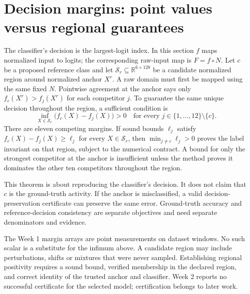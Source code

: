 \documentclass[11pt,a4paper]{article}
\newcommand{\R}{\mathbb R}\newcommand{\relu}{\operatorname{ReLU}}
\begin{document}
\section{Decision margins: point values versus regional guarantees}
The classifier's decision is the largest-logit index. In this section $f$ maps normalized input to logits; the corresponding raw-input map is $F=f\circ N$. Let $c$ be a proposed reference class and let $\mathcal S_r\subseteq\R^{6\times128}$ be a candidate normalized region around normalized anchor $X^r$. A raw domain must first be mapped using the same fixed $N$. Pointwise agreement at the anchor says only $f_c(X^r)>f_j(X^r)$ for each competitor $j$. To guarantee the same unique decision throughout the region, a sufficient condition is
\[
 \inf_{X\in\mathcal S_r}\big(f_c(X)-f_j(X)\big)>0
 \quad\text{for every }j\in\{1,\ldots,12\}\setminus\{c\}.
\]
There are eleven competing margins. If sound bounds $\ell_j$ satisfy $f_c(X)-f_j(X)\ge\ell_j$ for every $X\in\mathcal S_r$, then $\min_{j\ne c}\ell_j>0$ proves the label invariant on that region, subject to the numerical contract. A bound for only the strongest competitor at the anchor is insufficient unless the method proves it dominates the other ten competitors throughout the region.

This theorem is about reproducing the classifier's decision. It does not claim that $c$ is the ground-truth activity. If the anchor is misclassified, a valid decision-preservation certificate can preserve the same error. Ground-truth accuracy and reference-decision consistency are separate objectives and need separate denominators and evidence.

The Week 1 margin arrays are point measurements on dataset windows. No such scalar is a substitute for the infimum above. A candidate region may include perturbations, shifts or mixtures that were never sampled. Establishing regional positivity requires a sound bound, verified membership in the declared region, and correct identity of the trusted anchor and classifier. Week 2 reports no successful certificate for the selected model; certification belongs to later work.
\end{document}

